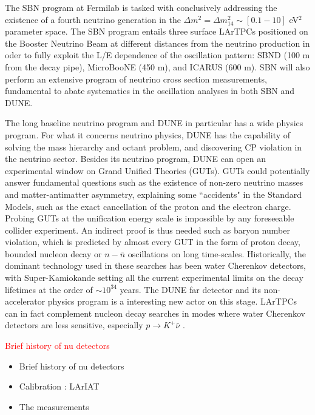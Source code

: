 The SBN program at Fermilab is tasked with conclusively addressing the existence of a fourth neutrino generation in the  $\Delta m^2= \Delta m^2_{14} \sim [0.1 - 10]$ eV$^2$ parameter space. The SBN program entails three surface LArTPCs positioned on the Booster Neutrino Beam at different distances from the neutrino production in oder to fully exploit  the L/E dependence of the oscillation pattern:  SBND (100 m from the decay pipe), MicroBooNE (450 m), and ICARUS (600 m). SBN will also perform an extensive 
program of neutrino cross section measurements, fundamental to abate systematics in the oscillation analyses in both SBN and DUNE.

The long baseline neutrino program and DUNE in particular has a wide physics program. For what it concerns neutrino physics, DUNE has the capability of solving the mass hierarchy and octant problem,  and discovering CP violation in the neutrino sector.
Besides its neutrino program, DUNE can open an experimental window on Grand Unified Theories (GUTs). GUTs could potentially answer fundamental questions such as the existence of non-zero neutrino masses and matter-antimatter asymmetry, explaining some ``accidents" in the Standard Models, such as the exact cancellation of the  proton and the electron charge.  
Probing GUTs at the unification energy scale is impossible by any foreseeable collider experiment. An indirect proof is thus needed such as baryon number violation, which is predicted by almost every GUT in the form of proton decay, bounded nucleon decay or $n-\bar n$ oscillations on long time-scales. Historically, the dominant technology used in these searches has been water Cherenkov detectors, with Super-Kamiokande setting all the current experimental limits on the decay lifetimes at the order of $\sim 10 ^{34}$ years. The DUNE far detector and its non-accelerator physics program is a interesting new actor on this stage.  LArTPCs can in fact complement nucleon decay searches in modes where water Cherenkov detectors are less sensitive, especially $p\rightarrow K^+\bar{\nu}$  \cite{Adams:2013qkq}.



\textcolor{red}{Brief history of nu detectors}

\begin{itemize}
\item Brief history of nu detectors
\item Calibration : LArIAT
\item The measurements
\end{itemize}



